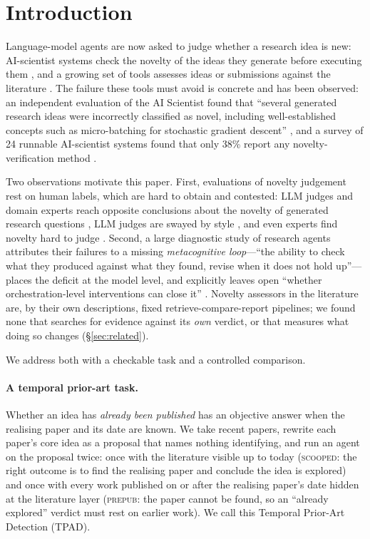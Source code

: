 \section{Introduction}

Language-model agents are now asked to judge whether a research idea is new: AI-scientist systems check the novelty of the ideas they generate before executing them \citep{lu2024the,yamada2025the}, and a growing set of tools assesses ideas or submissions against the literature \citep{shahid2025literaturegrounded,moussa2025scholareval,zhang2026opennovelty,hou2026memonoveltyagent,qiao2026innoeval}. The failure these tools must avoid is concrete and has been observed: an independent evaluation of the AI Scientist found that ``several generated research ideas were incorrectly classified as novel, including well-established concepts such as micro-batching for stochastic gradient descent'' \citep{beel2025evaluating}, and a survey of 24 runnable AI-scientist systems found that only 38\% report any novelty-verification method \citep{ding2026autonomous}.

Two observations motivate this paper. First, evaluations of novelty judgement rest on human labels, which are hard to obtain and contested: LLM judges and domain experts reach opposite conclusions about the novelty of generated research questions \citep{sinhahajari2026on}, LLM judges are swayed by style \citep{ji2026style}, and even experts find novelty hard to judge \citep{si2024can}. Second, a large diagnostic study of research agents attributes their failures to a missing \emph{metacognitive loop}---``the ability to check what they produced against what they found, revise when it does not hold up''---places the deficit at the model level, and explicitly leaves open ``whether orchestration-level interventions can close it'' \citep{fei2026how}. Novelty assessors in the literature are, by their own descriptions, fixed retrieve-compare-report pipelines; we found none that searches for evidence against its \emph{own} verdict, or that measures what doing so changes (\S\ref{sec:related}).

We address both with a checkable task and a controlled comparison.

\paragraph{A temporal prior-art task.} Whether an idea has \emph{already been published} has an objective answer when the realising paper and its date are known. We take recent papers, rewrite each paper's core idea as a proposal that names nothing identifying, and run an agent on the proposal twice: once with the literature visible up to today (\textsc{scooped}: the right outcome is to find the realising paper and conclude the idea is explored) and once with every work published on or after the realising paper's date hidden at the literature layer (\textsc{prepub}: the paper cannot be found, so an ``already explored'' verdict must rest on earlier work). We call this Temporal Prior-Art Detection (TPAD).

